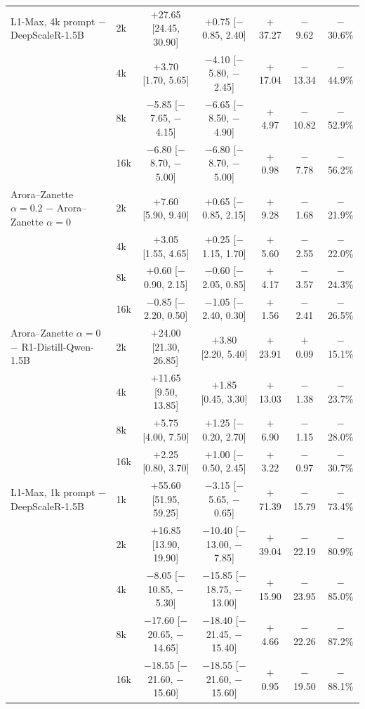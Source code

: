 \documentclass[10pt]{article}
\begin{document}
\begin{table}[h]
\begin{tabular}{llccccc}
\addlinespace
L1-Max, 4k prompt $-$ DeepScaleR-1.5B & 2k & $+$27.65 [24.45, 30.90] & $+$0.75 [$-$0.85, 2.40] & $+$37.27 & $-$9.62 & $-$30.6\% \\
 & 4k & $+$3.70 [1.70, 5.65] & $-$4.10 [$-$5.80, $-$2.45] & $+$17.04 & $-$13.34 & $-$44.9\% \\
 & 8k & $-$5.85 [$-$7.65, $-$4.15] & $-$6.65 [$-$8.50, $-$4.90] & $+$4.97 & $-$10.82 & $-$52.9\% \\
 & 16k & $-$6.80 [$-$8.70, $-$5.00] & $-$6.80 [$-$8.70, $-$5.00] & $+$0.98 & $-$7.78 & $-$56.2\% \\
\addlinespace
Arora--Zanette $\alpha{=}0.2$ $-$ Arora--Zanette $\alpha{=}0$ & 2k & $+$7.60 [5.90, 9.40] & $+$0.65 [$-$0.85, 2.15] & $+$9.28 & $-$1.68 & $-$21.9\% \\
 & 4k & $+$3.05 [1.55, 4.65] & $+$0.25 [$-$1.15, 1.70] & $+$5.60 & $-$2.55 & $-$22.0\% \\
 & 8k & $+$0.60 [$-$0.90, 2.15] & $-$0.60 [$-$2.05, 0.85] & $+$4.17 & $-$3.57 & $-$24.3\% \\
 & 16k & $-$0.85 [$-$2.20, 0.50] & $-$1.05 [$-$2.40, 0.30] & $+$1.56 & $-$2.41 & $-$26.5\% \\
\addlinespace
Arora--Zanette $\alpha{=}0$ $-$ R1-Distill-Qwen-1.5B & 2k & $+$24.00 [21.30, 26.85] & $+$3.80 [2.20, 5.40] & $+$23.91 & $+$0.09 & $-$15.1\% \\
 & 4k & $+$11.65 [9.50, 13.85] & $+$1.85 [0.45, 3.30] & $+$13.03 & $-$1.38 & $-$23.7\% \\
 & 8k & $+$5.75 [4.00, 7.50] & $+$1.25 [$-$0.20, 2.70] & $+$6.90 & $-$1.15 & $-$28.0\% \\
 & 16k & $+$2.25 [0.80, 3.70] & $+$1.00 [$-$0.50, 2.45] & $+$3.22 & $-$0.97 & $-$30.7\% \\
\addlinespace
L1-Max, 1k prompt $-$ DeepScaleR-1.5B & 1k & $+$55.60 [51.95, 59.25] & $-$3.15 [$-$5.65, $-$0.65] & $+$71.39 & $-$15.79 & $-$73.4\% \\
 & 2k & $+$16.85 [13.90, 19.90] & $-$10.40 [$-$13.00, $-$7.85] & $+$39.04 & $-$22.19 & $-$80.9\% \\
 & 4k & $-$8.05 [$-$10.85, $-$5.30] & $-$15.85 [$-$18.75, $-$13.00] & $+$15.90 & $-$23.95 & $-$85.0\% \\
 & 8k & $-$17.60 [$-$20.65, $-$14.65] & $-$18.40 [$-$21.45, $-$15.40] & $+$4.66 & $-$22.26 & $-$87.2\% \\
 & 16k & $-$18.55 [$-$21.60, $-$15.60] & $-$18.55 [$-$21.60, $-$15.60] & $+$0.95 & $-$19.50 & $-$88.1\% \\
\bottomrule
\end{tabular}
\end{table}
\end{document}
